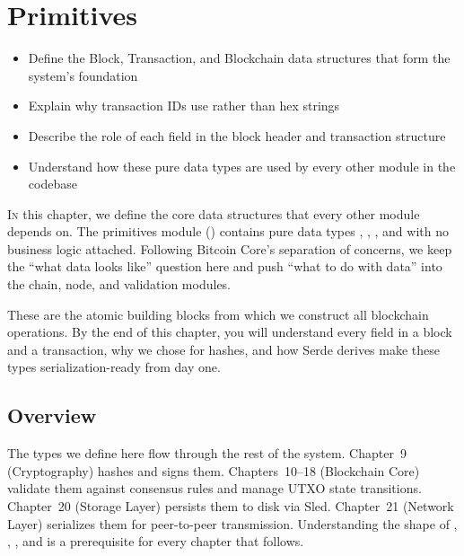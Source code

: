 \chapter{Primitives}
\label{ch:primitives}

\begin{learnbox}
\begin{itemize}
  \item Define the Block, Transaction, and Blockchain data structures that form the system's foundation
  \item Explain why transaction IDs use  rather than hex strings
  \item Describe the role of each field in the block header and transaction structure
  \item Understand how these pure data types are used by every other module in the codebase
\end{itemize}
\end{learnbox}

\lettrine{I}{n} this chapter, we define the core data structures that every other module depends on. The primitives module () contains pure data types , , , and  with no business logic attached. Following Bitcoin Core's separation of concerns, we keep the ``what data looks like'' question here and push ``what to do with data'' into the chain, node, and validation modules.

These are the atomic building blocks from which we construct all blockchain operations. By the end of this chapter, you will understand every field in a block and a transaction, why we chose  for hashes, and how Serde derives make these types serialization-ready from day one.

\section{Overview}
\label{sec:ch06-overview}

The types we define here flow through the rest of the system. Chapter~9 (Cryptography) hashes and signs them. Chapters~10--18 (Blockchain Core) validate them against consensus rules and manage UTXO state transitions. Chapter~20 (Storage Layer) persists them to disk via Sled. Chapter~21 (Network Layer) serializes them for peer-to-peer transmission. Understanding the shape of , , , and  is a prerequisite for every chapter that follows.

